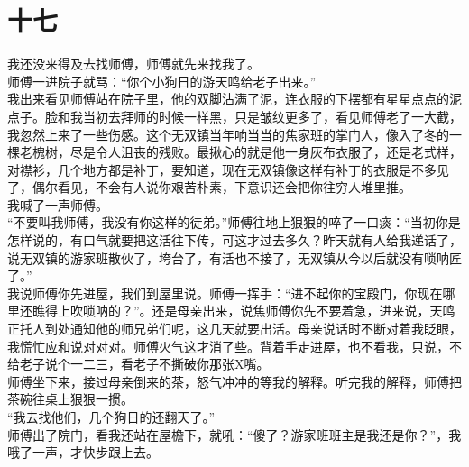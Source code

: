 \fancyhead[RO]{\thepage} %
\fancyhead[LE]{\thepage} %
\fancyfoot[LE,RO]{}
\fancyfoot[LO,CE]{}
\fancyfoot[CO,RE]{}
\chapter*{十七}
我还没来得及去找师傅，师傅就先来找我了。\\

师傅一进院子就骂：“你个小狗日的游天鸣给老子出来。”\\

我出来看见师傅站在院子里，他的双脚沾满了泥，连衣服的下摆都有星星点点的泥点子。脸和我当初去拜师的时候一样黑，只是皱纹更多了，看见师傅老了一大截，我忽然上来了一些伤感。这个无双镇当年响当当的焦家班的掌门人，像入了冬的一棵老槐树，尽是令人沮丧的残败。最揪心的就是他一身灰布衣服了，还是老式样，对襟衫，几个地方都是补丁，要知道，现在无双镇像这样有补丁的衣服是不多见了，偶尔看见，不会有人说你艰苦朴素，下意识还会把你往穷人堆里推。\\

我喊了一声师傅。\\

“不要叫我师傅，我没有你这样的徒弟。”师傅往地上狠狠的啐了一口痰：“当初你是怎样说的，有口气就要把这活往下传，可这才过去多久？昨天就有人给我递话了，说无双镇的游家班散伙了，垮台了，有活也不接了，无双镇从今以后就没有唢呐匠了。”\\

我说师傅你先进屋，我们到屋里说。师傅一挥手：“进不起你的宝殿门，你现在哪里还瞧得上吹唢呐的？”。还是母亲出来，说焦师傅你先不要着急，进来说，天鸣正托人到处通知他的师兄弟们呢，这几天就要出活。母亲说话时不断对着我眨眼，我慌忙应和说对对对。师傅火气这才消了些。背着手走进屋，也不看我，只说，不给老子说个一二三，看老子不撕破你那张X嘴。\\

师傅坐下来，接过母亲倒来的茶，怒气冲冲的等我的解释。听完我的解释，师傅把茶碗往桌上狠狠一掼。\\

“我去找他们，几个狗日的还翻天了。”\\

师傅出了院门，看我还站在屋檐下，就吼：“傻了？游家班班主是我还是你？”，我哦了一声，才快步跟上去。\\

